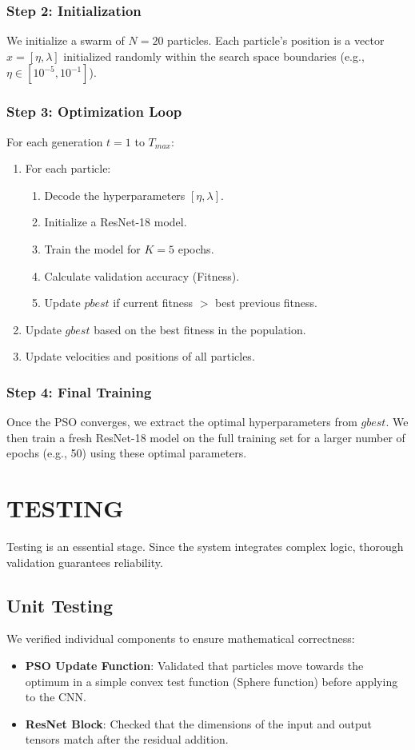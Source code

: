 \documentclass[twocolumn,10pt,a4paper]{article}
\begin{document}
\subsubsection{Step 2: Initialization}
We initialize a swarm of $N=20$ particles. Each particle's position is a vector $x = [\eta, \lambda]$ initialized randomly within the search space boundaries (e.g., $\eta \in [10^{-5}, 10^{-1}]$).

\subsubsection{Step 3: Optimization Loop}
For each generation $t=1$ to $T_{max}$:
\begin{enumerate}
    \item For each particle:
    \begin{enumerate}
        \item Decode the hyperparameters $[\eta, \lambda]$.
        \item Initialize a ResNet-18 model.
        \item Train the model for $K=5$ epochs.
        \item Calculate validation accuracy (Fitness).
        \item Update $pbest$ if current fitness $>$ best previous fitness.
    \end{enumerate}
    \item Update $gbest$ based on the best fitness in the population.
    \item Update velocities and positions of all particles.
\end{enumerate}

\subsubsection{Step 4: Final Training}
Once the PSO converges, we extract the optimal hyperparameters from $gbest$. We then train a fresh ResNet-18 model on the full training set for a larger number of epochs (e.g., 50) using these optimal parameters.

\section{TESTING}
Testing is an essential stage. Since the system integrates complex logic, thorough validation guarantees reliability.

\subsection{Unit Testing}
We verified individual components to ensure mathematical correctness:
\begin{itemize}
    \item \textbf{PSO Update Function}: Validated that particles move towards the optimum in a simple convex test function (Sphere function) before applying to the CNN.
    \item \textbf{ResNet Block}: Checked that the dimensions of the input and output tensors match after the residual addition.
\end{itemize}
\end{document}
